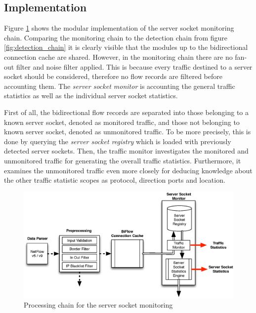 \subsection{Implementation}

Figure \ref{fig:monitoring_chain} shows the modular implementation of the \gls{server socket} monitoring chain. Comparing the monitoring chain to the detection chain from figure \ref{fig:detection_chain} it is clearly visible that the modules up to the bidirectional connection cache are shared. However, in the monitoring chain there are no fan-out filter and noise filter applied. This is because every traffic destined to a \gls{server socket} should be considered, therefore no flow records are filtered before accounting them. The \emph{server socket monitor} is accounting the general traffic statistics as well as the individual \gls{server socket} statistics.

First of all, the bidirectional flow records are separated into those belonging to a known \gls{server socket}, denoted as monitored traffic, and those not belonging to known \gls{server socket}, denoted as unmonitored traffic. To be more precisely, this is done by querying the \emph{server socket registry} which is loaded with previously detected \glspl{server socket}. Then, the traffic monitor investigates the monitored and unmonitored traffic for generating the overall traffic statistics.
Furthermore, it examines the unmonitored traffic even more closely for deducing knowledge about the other traffic statistic scopes as protocol, direction ports and location.

\begin{figure}[hb]
	\centering
	\includegraphics[width=\linewidth]{images/TrackingChain.eps}
	\caption{Processing chain for the server socket monitoring}
	\label{fig:monitoring_chain}
\end{figure}

